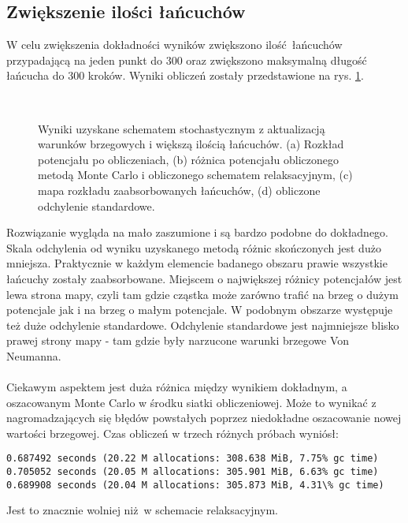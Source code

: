 \documentclass[a4paper, 12pt]{article}
\begin{document}
	\subsection*{Zwiększenie ilości łańcuchów}
	
	W celu zwiększenia dokładności wyników zwiększono ilość łańcuchów przypadającą na jeden punkt do 300 oraz zwiększono maksymalną długość łańcucha do 300 kroków.
	Wyniki obliczeń zostały przedstawione na rys. \ref{task_3}.
	\begin{figure}[h]
		\centering
		\begin{subfigure}{0.49\textwidth}
			\centering
			
			\caption{}		
		\end{subfigure}
		\begin{subfigure}{0.49\textwidth}
			\centering
			
			\caption{}		
		\end{subfigure}
		\\
		\begin{subfigure}{0.49\textwidth}
			\centering
			
			\caption{}		
		\end{subfigure}
		\begin{subfigure}{0.49\textwidth}
			\centering
			
			\caption{}		
		\end{subfigure}
		\caption{Wyniki uzyskane schematem stochastycznym z aktualizacją warunków brzegowych i większą ilością łańcuchów. (a) Rozkład potencjału po obliczeniach, (b) różnica potencjału obliczonego metodą Monte Carlo i obliczonego schematem relaksacyjnym, (c) mapa rozkładu zaabsorbowanych łańcuchów, (d) obliczone odchylenie standardowe.}
		\label{task_3}
	\end{figure}
	Rozwiązanie wygląda na mało zaszumione i są bardzo podobne do dokładnego. 
	Skala odchylenia od wyniku uzyskanego metodą różnic skończonych jest dużo mniejsza. 
	Praktycznie w każdym elemencie badanego obszaru prawie wszystkie łańcuchy zostały zaabsorbowane.
	Miejscem o największej różnicy potencjałów jest lewa strona mapy, czyli tam gdzie cząstka może zarówno trafić na brzeg o dużym potencjale jak i na brzeg o małym potencjale. 
	W podobnym obszarze występuje też duże odchylenie standardowe.
	Odchylenie standardowe jest najmniejsze blisko prawej strony mapy - tam gdzie były narzucone warunki brzegowe Von Neumanna.
	\\
	\\
	Ciekawym aspektem jest duża różnica między wynikiem dokładnym, a oszacowanym Monte Carlo w środku siatki obliczeniowej.
	Może to wynikać z nagromadzających się błędów powstałych poprzez niedokładne oszacowanie nowej wartości brzegowej.
	Czas obliczeń w trzech różnych próbach wyniósł:
	\begin{verbatim}
0.687492 seconds (20.22 M allocations: 308.638 MiB, 7.75% gc time)
0.705052 seconds (20.05 M allocations: 305.901 MiB, 6.63% gc time)
0.689908 seconds (20.04 M allocations: 305.873 MiB, 4.31\% gc time)
	\end{verbatim}
	Jest to znacznie wolniej niż w schemacie relaksacyjnym.
	
\end{document}
